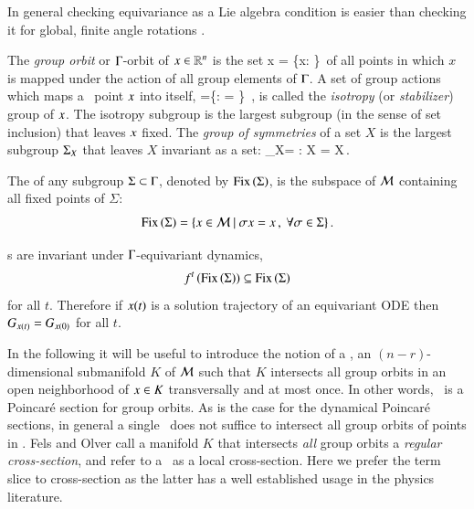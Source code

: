 In general checking equivariance as a Lie algebra condition
 is easier than checking it for global,
finite angle rotations .

The \emph{group orbit} or $\Gamma$-orbit of
$x\in\mathbb{R}^{n}$ is the set
\beq
	\Group x = \{\Glmn x: \Glmn\in\Group\}\,
\eeq
of all points in which $x$ is mapped under the action of all
group elements of $\Gamma$.
A set of group actions which maps a \statesp\ point $x$ into itself,
\beq
\stab{\ssp} =\{\Glmn \in \Group: \Glmn \ssp = \ssp \}
    \,,
is called the \emph{isotropy} (or \emph{stabilizer})  group of $\ssp$.
The isotropy subgroup is the largest subgroup (in the
sense of set inclusion) that leaves $\ssp$ fixed.
The \emph{group of symmetries} of a set $X$ is the largest
subgroup $\Subgroup_X$ that leaves $X$ invariant as a set:
\beq
	\Subgroup_X= {\Glmn: \Glmn X = X}\,.
\eeq

The \emph{\fixedsp} of any subgroup $\Sigma\subset\Gamma$,
denoted by $\mathrm{Fix}\left(\Sigma\right)$, is the subspace of $\mathcal{M}$ containing all fixed points of $\Sigma$:
\[
	\mathrm{Fix}\left(\Sigma\right)=\{x\in\mathcal{M}\ |\ \sigma x = x\,,\ \forall \sigma\in\Sigma\}\,.
\]

\Fixedsp s are invariant under $\Gamma$-equivariant dynamics,
\[
 f^t\left(\mathrm{Fix}\left(\Sigma\right)\right)\subseteq \mathrm{Fix}\left(\Sigma\right)
\] for all
$t$. Therefore if $x(t)$ is a solution trajectory of an
equivariant ODE then $G_{x(t)}=G_{x(0)}$ for all $t$.

In the following it will be useful to introduce the
notion of a \emph{\slice}, an $(n-r)$-dimensional submanifold $K$
of $\mathcal{M}$ such that $K$ intersects all group orbits in an
open neighborhood of $x \in K$
transversally and at most once.
In other words, \slice\ is a Poincar\'e section for group
orbits. As is the case for the dynamical Poincar\'e sections,
in general a single \slice\ does not suffice to intersect all
group orbits of points in \pS. Fels and Olver
call a manifold $K$ that intersects \emph{all} group orbits a
\emph{regular cross-section}, and refer to a \slice\ as a local
cross-section. Here we prefer the term slice
to cross-section as the latter has a well established usage in the physics
literature.  


